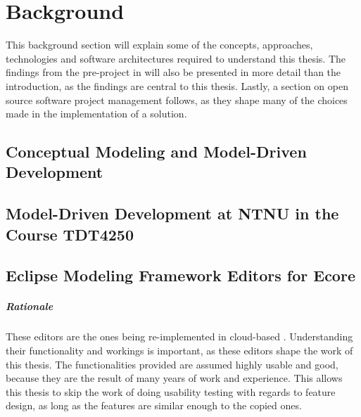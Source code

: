 \chapter{Background}\label{chap:background}

This background section will explain some of the concepts, approaches, technologies and software architectures required to understand this thesis.
The findings from the pre-project in \cite{rekstadModelingEnvironmentCloud2020} will also be presented in more detail than the introduction, as the findings are central to this thesis.
Lastly, a section on open source software project management follows, as they shape many of the choices made in the implementation of a solution.

\section{Conceptual Modeling and Model-Driven Development}\label{sec:conceptual-modeling}




\section{Model-Driven Development at NTNU in the Course TDT4250}\label{sec:tdt4250}




\section{Eclipse Modeling Framework Editors for Ecore}

\paragraph{Rationale}
These editors are the ones being re-implemented in \gls{cloud}-based .
Understanding their functionality and workings is important, as these editors shape the work of this thesis.
The functionalities provided are assumed highly usable and good, because they are the result of many years of work and experience.
This allows this thesis to skip the work of doing usability testing with regards to feature design, as long as the features are similar enough to the copied ones.

